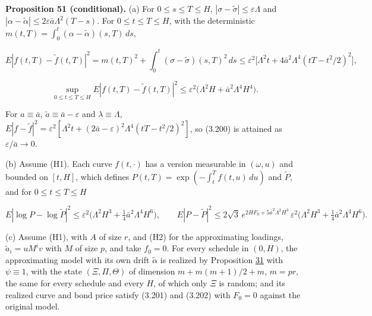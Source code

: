 \documentclass[11pt]{article}
\begin{document}
\label{res:Proposition-51}
\textbf{Proposition 51 (conditional).} (a) For \(0\le s\le T\le H\), \(|\sigma-\tilde\sigma|\le\varepsilon\Lambda\) and \(|\alpha-\tilde\alpha|\le2\varepsilon\bar a\Lambda^2(T-s)\). For \(0\le t\le T\le H\), with the deterministic \(m(t,T)=\int_0^t(\alpha-\tilde\alpha)(s,T)\,ds\),

\begin{equation*}
E|f(t,T)-\tilde f(t,T)|^2=m(t,T)^2+\int_0^t(\sigma-\tilde\sigma)(s,T)^2\,ds\le\varepsilon^2\bigl[\Lambda^2t+4\bar a^2\Lambda^4(tT-t^2/2)^2\bigr], \tag{3.200}\label{eq:3.200}
\end{equation*}

\begin{equation*}
\sup_{0\le t\le T\le H}E|f(t,T)-\tilde f(t,T)|^2\le\varepsilon^2\bigl(\Lambda^2H+\bar a^2\Lambda^4H^4\bigr). \tag{3.201}\label{eq:3.201}
\end{equation*}

For \(a\equiv\bar a\), \(\tilde a\equiv\bar a-\varepsilon\) and \(\lambda\equiv\Lambda\), \(E|f-\tilde f|^2=\varepsilon^2[\Lambda^2t+(2\bar a-\varepsilon)^2\Lambda^4(tT-t^2/2)^2]\), so (3.200) is attained as \(\varepsilon/\bar a\to0\).

(b) Assume (H1). Each curve \(f(t,\cdot)\) has a version measurable in \((\omega,u)\) and bounded on \([t,H]\), which defines \(P(t,T)=\exp(-\int_t^Tf(t,u)\,du)\) and \(\tilde P\), and for \(0\le t\le T\le H\)

\begin{equation*}
E|\log P-\log\tilde P|^2\le\varepsilon^2\bigl(\Lambda^2H^3+\tfrac14\bar a^2\Lambda^4H^6\bigr),\qquad E|P-\tilde P|^2\le2\sqrt3\,e^{2HF_0+5\bar a^2\Lambda^2H^3}\,\varepsilon^2\bigl(\Lambda^2H^3+\tfrac14\bar a^2\Lambda^4H^6\bigr). \tag{3.202}\label{eq:3.202}
\end{equation*}

(c) Assume (H1), with \(A\) of size \(r\), and (H2) for the approximating loadings, \(\tilde a_i=uM^iv\) with \(M\) of size \(p\), and take \(f_0=0\). For every schedule in \((0,H)\), the approximating model with its own drift \(\tilde\alpha\) is realized by Proposition \hyperref[res:Proposition-31]{31} with \(\psi\equiv1\), with the state \((\Xi,\Pi,\Theta)\) of dimension \(m+m(m+1)/2+m\), \(m=pr\), the same for every schedule and every \(H\), of which only \(\Xi\) is random; and its realized curve and bond price satisfy (3.201) and (3.202) with \(F_0=0\) against the original model.
\end{document}

